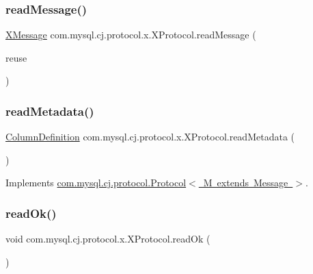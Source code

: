 \subsubsection{\texorpdfstring{read\+Message()}{readMessage()}}
{\footnotesize\ttfamily \mbox{\hyperlink{classcom_1_1mysql_1_1cj_1_1protocol_1_1x_1_1_x_message}{X\+Message}} com.\+mysql.\+cj.\+protocol.\+x.\+X\+Protocol.\+read\+Message (\begin{DoxyParamCaption}\item[{\mbox{\hyperlink{classcom_1_1mysql_1_1cj_1_1protocol_1_1x_1_1_x_message}{X\+Message}}}]{reuse }\end{DoxyParamCaption})}

\mbox{\label{classcom_1_1mysql_1_1cj_1_1protocol_1_1x_1_1_x_protocol_a99e20fc57fa97bd0a490d9cfe725e2fa}} 
\subsubsection{\texorpdfstring{read\+Metadata()}{readMetadata()}}
{\footnotesize\ttfamily \mbox{\hyperlink{interfacecom_1_1mysql_1_1cj_1_1protocol_1_1_column_definition}{Column\+Definition}} com.\+mysql.\+cj.\+protocol.\+x.\+X\+Protocol.\+read\+Metadata (\begin{DoxyParamCaption}{ }\end{DoxyParamCaption})}



Implements \mbox{\hyperlink{interfacecom_1_1mysql_1_1cj_1_1protocol_1_1_protocol_a65f8a3d80ead4cf22ffe65c539f2f851}{com.\+mysql.\+cj.\+protocol.\+Protocol$<$ M extends Message $>$}}.

\mbox{\label{classcom_1_1mysql_1_1cj_1_1protocol_1_1x_1_1_x_protocol_ab79c27fb0d698a01aeed13edeabbb000}} 
\subsubsection{\texorpdfstring{read\+Ok()}{readOk()}}
{\footnotesize\ttfamily void com.\+mysql.\+cj.\+protocol.\+x.\+X\+Protocol.\+read\+Ok (\begin{DoxyParamCaption}{ }\end{DoxyParamCaption})}


